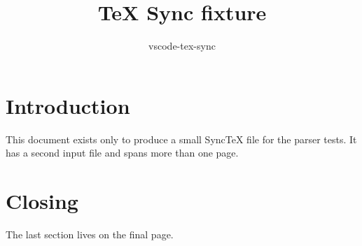 \documentclass{article}
\title{TeX Sync fixture}
\author{vscode-tex-sync}
\date{}
\begin{document}
\maketitle

\section{Introduction}
This document exists only to produce a small SyncTeX file for the parser tests.
It has a second input file and spans more than one page.



\section{Closing}
The last section lives on the final page.
\end{document}
